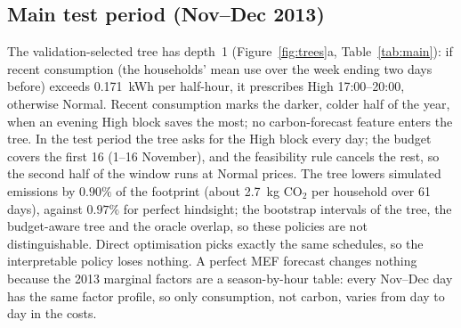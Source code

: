 \documentclass[11pt]{article}
\newcommand{\pct}[1]{$#1\%$}
\begin{document}
\subsection{Main test period (Nov--Dec 2013)}
The validation-selected tree has depth~1 (Figure~\ref{fig:trees}a, Table~\ref{tab:main}): if recent consumption
(the households' mean use over the week ending two days before) exceeds 0.171~kWh per half-hour, it prescribes High
17:00--20:00, otherwise Normal. Recent consumption marks the darker, colder half of the year, when an evening High
block saves the most; no carbon-forecast feature enters the tree. In the test period the tree asks for
the High block every day; the budget covers the first 16 (1--16 November), and the feasibility rule cancels the rest,
so the second half of the window runs at Normal prices. The tree lowers simulated emissions by \pct{0.90} of the
footprint (about 2.7~kg CO$_2$ per household over 61 days), against \pct{0.97} for perfect hindsight; the bootstrap
intervals of the tree, the budget-aware tree and the oracle overlap, so these policies are not distinguishable.
Direct optimisation picks exactly the same schedules, so the interpretable policy loses nothing. A perfect MEF
forecast changes nothing because the 2013 marginal factors are a season-by-hour table: every Nov--Dec day has the same
factor profile, so only consumption, not carbon, varies from day to day in the costs.
\end{document}
